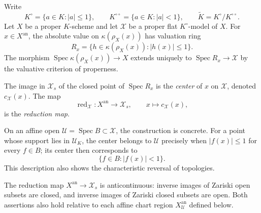 Write
\[
 K^\circ=\{a\in K:|a|\leq1\},\qquad
 K^{\circ\circ}=\{a\in K:|a|<1\},\qquad
 \widetilde K=K^\circ/K^{\circ\circ}.
\]
Let $X$ be a proper $K$-scheme and let $\mathcal X$ be a proper flat
$K^\circ$-model of $X$. For $x\in X^{\mathrm{an}}$, the absolute value
on $\kappa(\rho_X(x))$ has valuation ring
\[
 R_x=\{h\in\kappa(\rho_X(x)):|h(x)|\leq1\}.
\]
The morphism $\operatorname{Spec}\kappa(\rho_X(x))\to X$ extends uniquely
to $\operatorname{Spec}R_x\to\mathcal X$ by the valuative criterion of
properness.

\begin{definition}\label{def:berk-center-reduction}
The image in $\mathcal X_s$ of the closed point of
$\operatorname{Spec}R_x$ is the \emph{center} of $x$ on $\mathcal X$,
denoted $c_{\mathcal X}(x)$. The map
\[
             \operatorname{red}_{\mathcal X}:X^{\mathrm{an}}
             \longrightarrow\mathcal X_s,
             \qquad x\longmapsto c_{\mathcal X}(x),
\]
is the \emph{reduction map}.
\end{definition}

On an affine open $\mathcal U=\operatorname{Spec}B\subset\mathcal X$, the
construction is concrete. For a point whose support lies in
$\mathcal U_K$, the center belongs to $\mathcal U$ precisely when
$|f(x)|\leq1$ for every $f\in B$; its center then corresponds to
\[
                   \{f\in B:|f(x)|<1\}.
\]
This description also shows the characteristic reversal of topologies.

\begin{proposition}
\label{prop:berk-reduction-anticontinuous}
The reduction map $X^{\mathrm{an}}\to\mathcal X_s$ is anticontinuous:
inverse images of Zariski open subsets are closed, and inverse images of
Zariski closed subsets are open. Both assertions also hold relative to each
affine chart region $X^{\mathrm{an}}_{\mathcal U}$ defined below.
\end{proposition}

